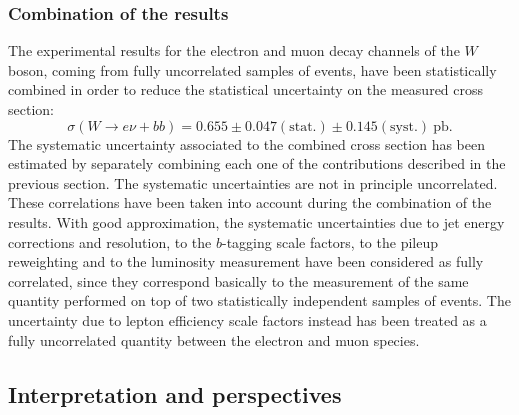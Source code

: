 \subsubsection{Combination of the results}

The experimental results for the electron and muon decay channels
of the $W$ boson, coming from fully uncorrelated samples of events, 
have been statistically combined in order to reduce the statistical 
uncertainty on the measured cross section:
$$\sigma (W \rightarrow e \nu + bb) = 0.655 \pm 0.047\mathrm{(stat.)} \pm 0.145\mathrm{(syst.)}~\mathrm{pb.}$$
The systematic uncertainty associated to the combined cross section 
has been estimated by separately combining each one of the contributions
described in the previous section.
The systematic uncertainties are not in principle uncorrelated. 
These correlations have been taken into account during the combination 
of the results.
With good approximation, the systematic uncertainties due to 
jet energy corrections and resolution, to the $b$-tagging scale factors, to the 
pileup reweighting and to the luminosity measurement have been 
considered as fully correlated, since they correspond basically to the 
measurement of the same quantity performed on top of two statistically independent 
samples of events.
The uncertainty due to lepton efficiency scale factors instead has been treated as a 
fully uncorrelated quantity between the electron and muon species.

\subsection{Interpretation and perspectives}

